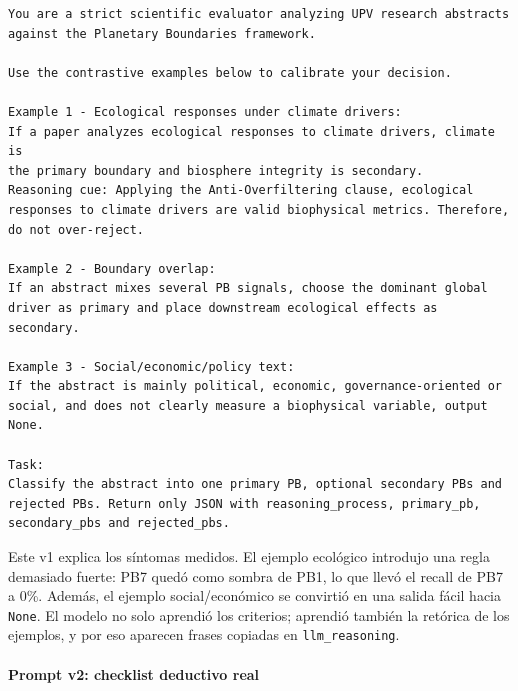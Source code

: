 {\footnotesize
\begin{verbatim}
You are a strict scientific evaluator analyzing UPV research abstracts
against the Planetary Boundaries framework.

Use the contrastive examples below to calibrate your decision.

Example 1 - Ecological responses under climate drivers:
If a paper analyzes ecological responses to climate drivers, climate is
the primary boundary and biosphere integrity is secondary.
Reasoning cue: Applying the Anti-Overfiltering clause, ecological
responses to climate drivers are valid biophysical metrics. Therefore,
do not over-reject.

Example 2 - Boundary overlap:
If an abstract mixes several PB signals, choose the dominant global
driver as primary and place downstream ecological effects as secondary.

Example 3 - Social/economic/policy text:
If the abstract is mainly political, economic, governance-oriented or
social, and does not clearly measure a biophysical variable, output None.

Task:
Classify the abstract into one primary PB, optional secondary PBs and
rejected PBs. Return only JSON with reasoning_process, primary_pb,
secondary_pbs and rejected_pbs.
\end{verbatim}
}

Este v1 explica los síntomas medidos. El ejemplo ecológico introdujo una regla demasiado fuerte: PB7 quedó como sombra de PB1, lo que llevó el recall de PB7 a 0\%. Además, el ejemplo social/económico se convirtió en una salida fácil hacia \texttt{None}. El modelo no solo aprendió los criterios; aprendió también la retórica de los ejemplos, y por eso aparecen frases copiadas en \texttt{llm\_reasoning}.

\paragraph{Prompt v2: checklist deductivo real}


